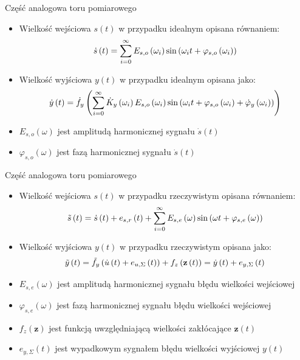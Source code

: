 \documentclass[12pt, polish, aspectratio = 169]{beamer}
\begin{document}
\begin{frame}{Część analogowa toru pomiarowego}
\begin{itemize}
\item Wielkość wejściowa $s(t)$ w przypadku idealnym opisana równaniem:
\begin{equation}
\dot{s} \left(t\right) = \sum _{i = 0} ^{\infty} E_{s,o} \left(\omega_{i}\right) \sin \left( \omega_{i} t + \varphi_{s,o} \left(\omega_{i}\right) \right) \label{eq:in_cont_omega_ideal}
\end{equation}
\item Wielkość wyjściowa $y(t)$ w przypadku idealnym opisana jako:
\begin{equation}
\dot{y} \left(t\right) = \dot{f}_{y} \left( \sum _{i = 0} ^{\infty} \dot{K}_{y} \left(\omega_{i}\right) E_{s,o} \left(\omega_{i}\right) \sin \left( \omega_{i} t + \varphi_{s,o} \left(\omega_{i}\right) + \dot{\varphi}_{y} \left(\omega_{i}\right) \right) \right) \label{eq:out_cont_omega_ideal}
\end{equation}
\item $E_{s,o}(\omega)$ jest amplitudą harmonicznej sygnału $\dot{s}(t)$
\item $\varphi_{s,o}(\omega)$ jest fazą harmonicznej sygnału $\dot{s}(t)$
\end{itemize}
\end{frame}

\begin{frame}{Część analogowa toru pomiarowego}
\begin{itemize}
\item Wielkość wejściowa $s(t)$ w przypadku rzeczywistym opisana równaniem:
\begin{equation}
\tilde{s} \left(t\right) = \dot{s} \left(t\right) + e_{s,r} \left(t\right) + \sum _{i = 0} ^{\infty} E_{s,e} \left(\omega\right) \sin \left( \omega t + \varphi_{s,e} \left(\omega\right) \right) \label{eq:in_cont_omega_real}
\end{equation}
\item Wielkość wyjściowa $y(t)$ w przypadku rzeczywistym opisana jako:
\begin{equation}
\tilde{y} \left(t\right) = \tilde{f}_{y} \left( \dot{u} \left(t\right) + e_{u,\Sigma} \left(t\right) \right) + f_{z} \left(\mathbf{z} \left(t\right)\right) = \dot{y} \left(t\right) + e_{y,\Sigma} \left(t\right) \label{eq:out_cont_real_all}
\end{equation}
\item $E_{s,e}(\omega)$ jest amplitudą harmonicznej sygnału błędu wielkości wejściowej
\item $\varphi_{s,e}(\omega)$ jest fazą harmonicznej sygnału błędu wielkości wejściowej
\item $f_{z}(\mathbf{z})$ jest funkcją uwzględniającą wielkości zakłócające $\mathbf{z}(t)$
\item $e_{y,\Sigma}(t)$ jest wypadkowym sygnałem błędu wielkości wyjściowej $y(t)$
\end{itemize}
\end{frame}
\end{document}
